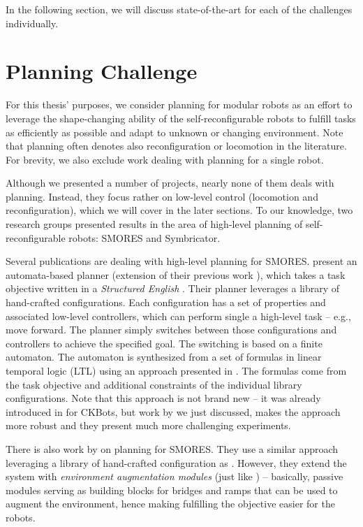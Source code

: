 In the following section, we will discuss state-of-the-art for each of the
challenges individually.

\section{Planning Challenge}\label{sec:chal-planning}

For this thesis' purposes, we consider planning for modular robots as an effort
to leverage the shape-changing ability of the self-reconfigurable robots to
fulfill tasks as efficiently as possible and adapt to unknown or changing
environment. Note that planning often denotes also reconfiguration or locomotion
in the literature. For brevity, we also exclude work dealing with planning for a
single robot.

Although we presented a number of projects, nearly none of them deals with
planning. Instead, they focus rather on low-level control (locomotion and
reconfiguration), which we will cover in the later sections. To our knowledge,
two research groups presented results in the area of high-level planning of
self-reconfigurable robots: SMORES and Symbricator.

Several publications are dealing with high-level planning for SMORES.
\textcite{DBLP:journals/arobots/JingTYK18} present an automata-based planner
(extension of their previous work \cite{DBLP:conf/ijcai/JingTYK17}), which takes
a task objective written in a \emph{Structured English}
\cite{DBLP:conf/iros/FinucaneJK10}. Their planner leverages a library of
hand-crafted configurations. Each configuration has a set of properties and
associated low-level controllers, which can perform single a high-level task --
e.g., move forward. The planner simply switches between those configurations and
controllers to achieve the specified goal. The switching is based on a finite
automaton. The automaton is synthesized from a set of formulas in linear
temporal logic (LTL) using an approach presented in
\cite{DBLP:journals/trob/Kress-GazitFP09}. The formulas come from the task
objective and additional constraints of the individual library configurations.
Note that this approach is not brand new -- it was already introduced in
\cite{DBLP:conf/iros/CastroKK11} for CKBots, but work by
\textcite{DBLP:journals/arobots/JingTYK18} we just discussed, makes the approach
more robust and they present much more challenging experiments.

There is also work by \textcite{DBLP:conf/icra/TosunDJKCY18} on planning for
SMORES. They use a similar approach leveraging a library of hand-crafted
configuration as \cite{DBLP:journals/arobots/JingTYK18}. However, they extend
the system with \emph{environment augmentation modules} (just like
\cite{DBLP:conf/rss/PetersenNW11}) -- basically, passive modules serving as
building blocks for bridges and ramps that can be used to augment the
environment, hence making fulfilling the objective easier for the robots.

